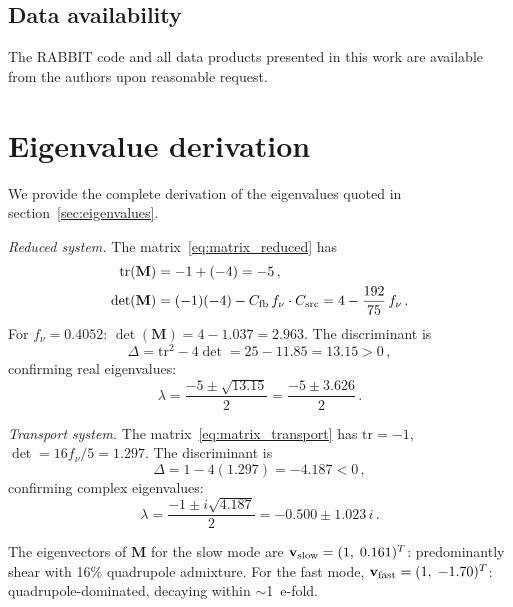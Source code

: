 \documentclass[a4paper,11pt]{article}
\begin{document}
\subsection*{Data availability}

The RABBIT code and all data products presented in this work are available from the authors upon reasonable request.


\appendix

\section{Eigenvalue derivation}\label{app:eigenvalues}

We provide the complete derivation of the eigenvalues quoted in section~\ref{sec:eigenvalues}.

\textit{Reduced system.}  The matrix~\eqref{eq:matrix_reduced} has
\begin{align}
\mathrm{tr}(\mathbf{M}) &= -1 + (-4) = -5\,,\\
\det(\mathbf{M}) &= (-1)(-4) - C_{\rm fb}\,f_\nu \cdot C_{\rm src} = 4 - \frac{192}{75}\,f_\nu\,.
\end{align}
For $f_\nu = 0.4052$: $\det(\mathbf{M}) = 4 - 1.037 = 2.963$.  The discriminant is
\begin{equation}
\Delta = \mathrm{tr}^2 - 4\det = 25 - 11.85 = 13.15 > 0\,,
\end{equation}
confirming real eigenvalues:
\begin{equation}
\lambda = \frac{-5 \pm \sqrt{13.15}}{2} = \frac{-5 \pm 3.626}{2}\,.
\end{equation}

\textit{Transport system.}  The matrix~\eqref{eq:matrix_transport} has $\mathrm{tr} = -1$, $\det = 16f_\nu/5 = 1.297$.  The discriminant is
\begin{equation}
\Delta = 1 - 4(1.297) = -4.187 < 0\,,
\end{equation}
confirming complex eigenvalues:
\begin{equation}
\lambda = \frac{-1 \pm i\sqrt{4.187}}{2} = -0.500 \pm 1.023\,i\,.
\end{equation}

The eigenvectors of $\mathbf{M}$ for the slow mode are $\mathbf{v}_{\rm slow} = (1,\; 0.161)^T$: predominantly shear with 16\% quadrupole admixture.  For the fast mode, $\mathbf{v}_{\rm fast} = (1,\; -1.70)^T$: quadrupole-dominated, decaying within $\sim$1~e-fold.
\end{document}
